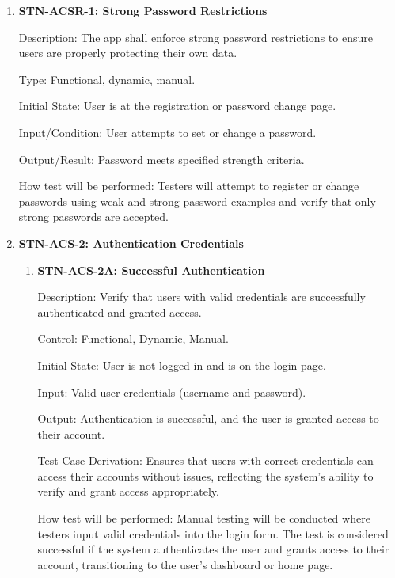 \documentclass[12pt, titlepage]{article}
\begin{document}
    \begin{enumerate}

        \item {\textbf{STN-ACSR-1: Strong Password Restrictions}}

        Description: The app shall enforce strong password restrictions to ensure users are properly protecting their own data.

        Type: Functional, dynamic, manual.

        Initial State: User is at the registration or password change page.

        Input/Condition: User attempts to set or change a password.

        Output/Result: Password meets specified strength criteria.

        How test will be performed: Testers will attempt to register or change passwords using weak and strong password examples and verify that only strong passwords are accepted.


        \item{\textbf{STN-ACS-2: Authentication Credentials}}

        \begin{enumerate}
                \item{\textbf{STN-ACS-2A: Successful Authentication}\\}
        
                Description: Verify that users with valid credentials are successfully authenticated and granted access.
        
                Control: Functional, Dynamic, Manual.
        
                Initial State: User is not logged in and is on the login page.
        
                Input: Valid user credentials (username and password).
        
                Output: Authentication is successful, and the user is granted access to their account.
        
                Test Case Derivation: Ensures that users with correct credentials can access their accounts without issues, reflecting the system's ability to verify and grant access appropriately.
        
                How test will be performed: Manual testing will be conducted where testers input valid credentials into the login form. The test is considered successful if the system authenticates the user and grants access to their account, transitioning to the user's dashboard or home page.
        

\end{enumerate}
\end{enumerate}
\end{document}
